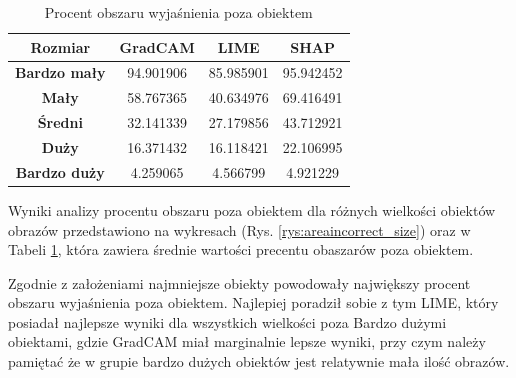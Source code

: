 \begin{table}[h]
	\centering
	\begin{tabular}{|c|c|c|c|}
		\hline
		\textbf{Rozmiar}     & \textbf{GradCAM} & \textbf{LIME} & \textbf{SHAP} \\
		\hline
		\textbf{Bardzo mały} & 94.901906        & 85.985901     & 95.942452     \\
		\hline
		\textbf{Mały}        & 58.767365        & 40.634976     & 69.416491     \\
		\hline
		\textbf{Średni}      & 32.141339        & 27.179856     & 43.712921     \\
		\hline
		\textbf{Duży}        & 16.371432        & 16.118421     & 22.106995     \\
		\hline
		\textbf{Bardzo duży} & 4.259065         & 4.566799      & 4.921229      \\
		\hline
	\end{tabular}
	\caption{Procent obszaru wyjaśnienia poza obiektem}
	\label{tab:size_area}
\end{table}

Wyniki analizy procentu obszaru poza obiektem dla różnych wielkości obiektów obrazów przedstawiono na wykresach (Rys. \ref{rys:areaincorrect_size}) oraz w Tabeli \ref{tab:size_area}, która zawiera średnie wartości precentu obaszarów poza obiektem.

Zgodnie z założeniami najmniejsze obiekty powodowały największy procent obszaru wyjaśnienia poza obiektem.
Najlepiej poradził sobie z tym LIME, który posiadał najlepsze wyniki dla wszystkich wielkości poza Bardzo dużymi obiektami, gdzie GradCAM miał marginalnie lepsze wyniki, przy czym należy pamiętać że w grupie bardzo dużych obiektów jest relatywnie mała ilość obrazów.

\vspace{1cm}

